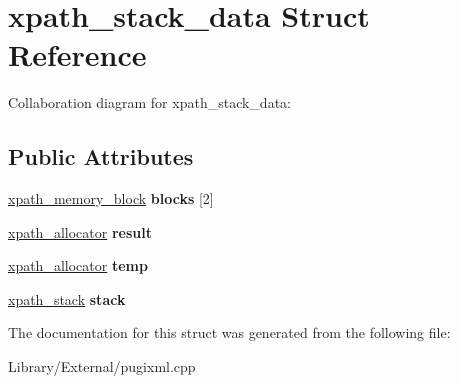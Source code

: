 \hypertarget{structxpath__stack__data}{}\section{xpath\+\_\+stack\+\_\+data Struct Reference}
\label{structxpath__stack__data}


Collaboration diagram for xpath\+\_\+stack\+\_\+data\+:
\subsection*{Public Attributes}
\begin{DoxyCompactItemize}
\item 
\hypertarget{structxpath__stack__data_a6821cc444dd65d997467fd3f757f4aff}{}\hyperlink{structxpath__memory__block}{xpath\+\_\+memory\+\_\+block} {\bfseries blocks} \mbox{[}2\mbox{]}\label{structxpath__stack__data_a6821cc444dd65d997467fd3f757f4aff}

\item 
\hypertarget{structxpath__stack__data_ab073a685c66383ded44076993afe62d6}{}\hyperlink{classxpath__allocator}{xpath\+\_\+allocator} {\bfseries result}\label{structxpath__stack__data_ab073a685c66383ded44076993afe62d6}

\item 
\hypertarget{structxpath__stack__data_a56e6bb486d52f4c5c2d02370e1b41058}{}\hyperlink{classxpath__allocator}{xpath\+\_\+allocator} {\bfseries temp}\label{structxpath__stack__data_a56e6bb486d52f4c5c2d02370e1b41058}

\item 
\hypertarget{structxpath__stack__data_ad26a92328f9aaf83fa62cb6695dbee90}{}\hyperlink{structxpath__stack}{xpath\+\_\+stack} {\bfseries stack}\label{structxpath__stack__data_ad26a92328f9aaf83fa62cb6695dbee90}

\end{DoxyCompactItemize}


The documentation for this struct was generated from the following file\+:\begin{DoxyCompactItemize}
\item 
Library/\+External/pugixml.\+cpp\end{DoxyCompactItemize}
